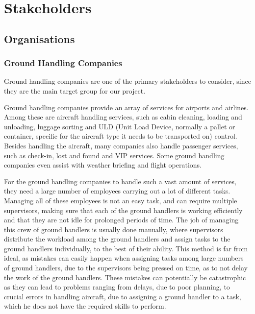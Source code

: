 \chapter{Stakeholders}
\section{Organisations}
\subsection{Ground Handling Companies}
Ground handling companies are one of the primary stakeholders to consider, since they are the main target group for our project.

Ground handling companies provide an array of services for airports and airlines. Among these are aircraft handling services, such as cabin cleaning, loading and unloading, luggage sorting and ULD (Unit Load Device, normally a pallet or container, specific for the aircraft type it needs to be transported on) control. Besides handling the aircraft, many companies also handle passenger services, such as check-in, lost and found and VIP services. Some ground handling companies even assist with weather briefing and flight operations.

For the ground handling companies to handle such a vast amount of services, they need a large number of employees carrying out a lot of different tasks. Managing all of these employees is not an easy task, and can require multiple supervisors, making sure that each of the ground handlers is working efficiently and that they are not idle for prolonged periods of time. The job of managing this crew of ground handlers is usually done manually, where supervisors distribute the workload among the ground handlers and assign tasks to the ground handlers individually, to the best of their ability.
This method is far from ideal, as mistakes can easily happen when assigning tasks among large numbers of ground handlers, due to the supervisors being pressed on time, as to not delay the work of the ground handlers. These mistakes can potentially be catastrophic as they can lead to problems ranging from delays, due to poor planning, to crucial errors in handling aircraft, due to assigning a ground handler to a task, which he does not have the required skills to perform.


